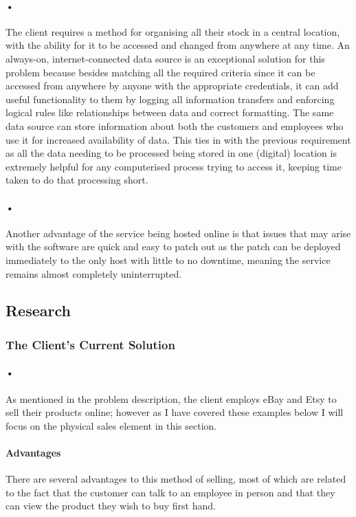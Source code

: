 ﻿\documentclass{article}
\begin{document}
    \paragraph{•}
    The client requires a method for organising all their stock in a central location, with the ability for it to be accessed and changed from anywhere at any time. 
    An always-on, internet-connected data source is an exceptional solution for this problem because besides matching all the required criteria since it can be accessed from anywhere by anyone with the appropriate credentials, it can add useful functionality to them by logging all information transfers and enforcing logical rules like relationships between data and correct formatting. 
    The same data source can store information about both the customers and employees who use it for increased availability of data. 
    This ties in with the previous requirement as all the data needing to be processed being stored in one (digital) location is extremely helpful for any computerised process trying to access it, keeping time taken to do that processing short.
    \paragraph{•}
    Another advantage of the service being hosted online is that issues that may arise with the software are quick and easy to patch out as the patch can be deployed immediately to the only host with little to no downtime, meaning the service remains almost completely uninterrupted.
    
    \subsection{Research}
    \subsubsection{The Client's Current Solution}
    \paragraph{•}
    As mentioned in the problem description, the client employs eBay and Etsy to sell their products online; however as I have covered these examples below I will focus on the physical sales element in this section.
    \paragraph{Advantages}
    There are several advantages to this method of selling, most of which are related to the fact that the customer can talk to an employee in person and that they can view the product they wish to buy first hand.
\end{document}
